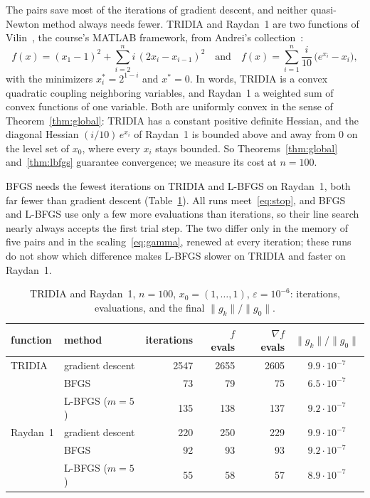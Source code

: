 \documentclass[11pt,a4paper]{amsart}
\numberwithin{equation}{section}
\theoremstyle{plain}
\theoremstyle{definition}
\theoremstyle{remark}
\newcommand{\grad}{\nabla}
\newcommand{\norm}[1]{\lVert #1 \rVert}
\begin{document}
The pairs save most of the iterations of gradient descent, and neither
quasi-Newton method always needs fewer. TRIDIA and Raydan~1 are two
functions of Vilin~\cite{vilin2018}, the course's MATLAB framework, from
Andrei's collection~\cite{andrei2008}:
\[
  f(x) = (x_1 - 1)^2 + \sum_{i=2}^n i\,(2x_i - x_{i-1})^2
  \quad\text{and}\quad
  f(x) = \sum_{i=1}^n \frac{i}{10}\,\bigl(e^{x_i} - x_i\bigr),
\]
with the minimizers $x^*_i = 2^{1-i}$ and $x^* = 0$. In words, TRIDIA
is a convex quadratic coupling neighboring variables, and Raydan~1 a
weighted sum of convex functions of one variable. Both are uniformly
convex in the sense of Theorem~\ref{thm:global}: TRIDIA has a constant
positive definite Hessian, and the diagonal Hessian $(i/10)\, e^{x_i}$
of Raydan~1 is bounded above and away from $0$ on the level set of
$x_0$, where every $x_i$ stays bounded. So Theorems~\ref{thm:global}
and~\ref{thm:lbfgs} guarantee convergence; we measure its cost at
$n = 100$.

BFGS needs the fewest iterations on TRIDIA and L-BFGS on Raydan~1, both
far fewer than gradient descent (Table~\ref{tab:vilin}). All runs
meet~\eqref{eq:stop}, and BFGS and L-BFGS use only a few more
evaluations than iterations, so their line search nearly always accepts
the first trial step. The two differ only in the memory of five pairs
and in the scaling~\eqref{eq:gamma}, renewed at every iteration; these
runs do not show which difference makes L-BFGS slower on TRIDIA and
faster on Raydan~1.

\begin{table}[tbp]
  \centering\small
  \caption{TRIDIA and Raydan~1, $n = 100$, $x_0 = (1, \dots, 1)$,
    $\varepsilon = 10^{-6}$: iterations, evaluations, and the final
    $\norm{g_k} / \norm{g_0}$.}
  \label{tab:vilin}
  \begin{tabular}{@{}llrrrc@{}}
    \toprule
    function & method & iterations & $f$ evals & $\grad f$ evals
      & $\norm{g_k} / \norm{g_0}$ \\
    \midrule
    TRIDIA   & gradient descent & 2547 & 2655 & 2605 & $9.9 \cdot 10^{-7}$ \\
             & BFGS             &   73 &   79 &   75 & $6.5 \cdot 10^{-7}$ \\
             & L-BFGS ($m = 5$) &  135 &  138 &  137 & $9.2 \cdot 10^{-7}$ \\
    \addlinespace
    Raydan~1 & gradient descent &  220 &  250 &  229 & $9.9 \cdot 10^{-7}$ \\
             & BFGS             &   92 &   93 &   93 & $9.2 \cdot 10^{-7}$ \\
             & L-BFGS ($m = 5$) &   55 &   58 &   57 & $8.9 \cdot 10^{-7}$ \\
    \bottomrule
  \end{tabular}
\end{table}
\end{document}
